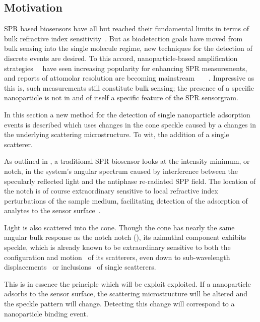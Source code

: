 \subsection{Motivation}
SPR based biosensors have all but reached
their fundamental limits in terms of bulk refractive index
sensitivity~\cite{piliarik2009surface}.  But as biodetection goals have
moved from bulk sensing into the single molecule regime, new techniques for
the detection of discrete events are desired.  To this accord,
nanoparticle-based amplification
strategies~\cite{wang2005nanomaterial}~\cite{jain2007review} have seen
increasing popularity for enhancing SPR measurements, and reports of
attomolar resolution are becoming
mainstream~\cite{fang2006attomole}~\cite{krishnan2011attomolar}~\cite{kwon2012nanoparticle}~\cite{sim2010attomolar}.
Impressive as this is, such measurements still constitute bulk sensing;
the presence of a specific nanoparticle is not in and of itself a
specific feature of the SPR sensorgram.

In this section a new method for the detection of single nanoparticle
adsorption events is described which uses changes in the cone speckle
caused by a changes in the underlying scattering microstructure.  To wit,
the addition of a single scatterer.

As outlined in , a traditional SPR biosensor looks at
the intensity minimum, or notch, in the system's angular spectrum caused by
interference between the specularly reflected light and the antiphase
re-radiated SPP field.  The location of the notch is of course
extraordinary sensitive to local refractive index perturbations of the
sample medium, facilitating detection of the adsorption of analytes to the
sensor surface~\cite{homola1999surface}.  

Light is also scattered into the cone.  Though the cone has nearly the same
angular bulk response as the notch notch (), its
azimuthal component exhibits speckle, which is already known to be
extraordinary sensitive to both the configuration and
motion~\cite{berkovits1994correlations} of its scatterers, even down to
sub-wavelength displacements~\cite{berkovits1991sensitivity} or
inclusions~\cite{berkovits1990theory} of single scatterers.

This is in essence the principle which will be exploit exploited.  If a
nanoparticle adsorbs to the sensor surface, the scattering microstructure
will be altered and the speckle pattern will change.  Detecting this change
will correspond to a nanoparticle binding event.

